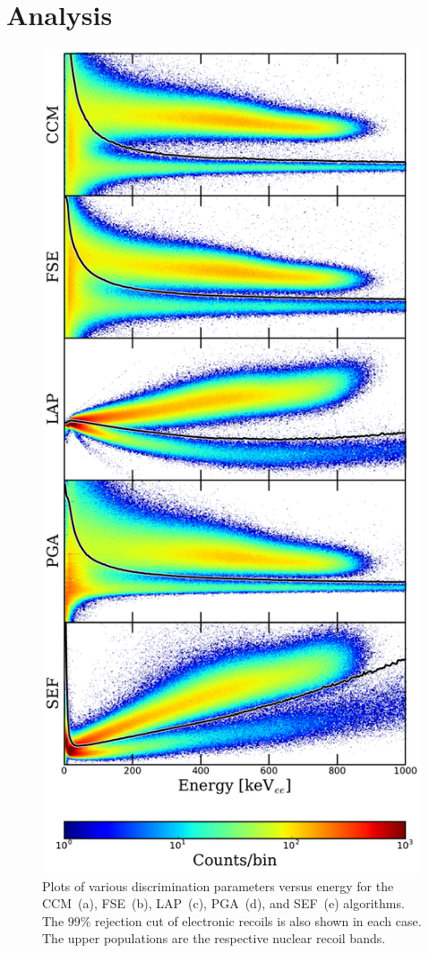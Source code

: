 \section{Analysis}

\begin{figure}[htbp]
\centering
    \includegraphics[height=\textheight]{figures/psd/fig_discrim_hists}
    \caption{Plots of various discrimination parameters versus energy for the CCM~(a), FSE~(b), LAP~(c), PGA~(d), and SEF~(e) algorithms. The $99\%$ rejection cut of electronic recoils is also shown in each case. The upper populations are the respective nuclear recoil bands.}\label{fig:discrimination_plot}
\end{figure}

